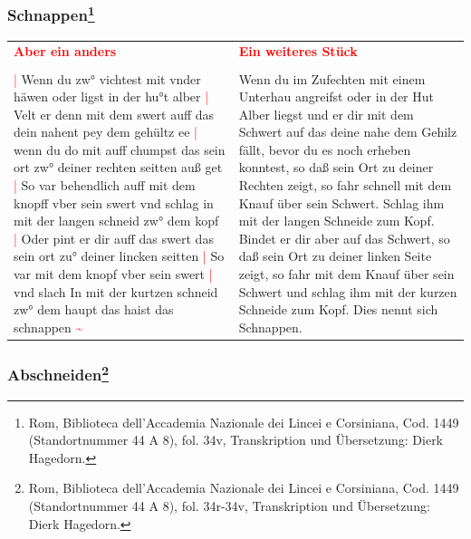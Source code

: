 \subsubsection[Schnappen]{
    Schnappen\footnote{
        \hspace*{0.5ex}Rom, Biblioteca dell'Accademia Nazionale dei Lincei e Corsiniana,
        Cod. 1449 (Standortnummer 44 A 8), fol. 34v, Transkription und Übersetzung: Dierk Hagedorn.}}

\begin{longtable}{p{6.25cm}p{6.25cm}}
    \textbf{\textcolor{red}{
        Aber ein anders}}
    &
    \textbf{\textcolor{red}{
        Ein weiteres Stück}}
    \\
    \\
    \textcolor{red}{|} Wenn du zw° vichtest mit vnder häwen oder ligst in der hu°t alber
    \textcolor{red}{|} Velt er denn mit dem swert auff das dein nahent pey dem gehültz ee
    \textcolor{red}{|} wenn du do mit auff chumpst das sein ort zw° deiner rechten seitten auß get
    \textcolor{red}{|} So var behendlich auff mit dem knopff vber sein swert vnd schlag in mit der langen schneid zw° dem kopf
    \textcolor{red}{|} Oder pint er dir auff das swert das sein ort zu° deiner lincken seitten
    \textcolor{red}{|} So var mit dem knopf vber sein swert
    \textcolor{red}{|} vnd slach In mit der kurtzen schneid zw° dem haupt das haist das schnappen \textcolor{red}{\textasciitilde{}}
    &
    Wenn du im Zufechten mit einem Unterhau angreifst oder in der Hut Alber liegst und er dir mit dem Schwert auf das deine nahe dem Gehilz fällt, bevor du es noch erheben konntest, so daß sein Ort zu deiner Rechten zeigt, so fahr schnell mit dem Knauf über sein Schwert.
    Schlag ihm mit der langen Schneide zum Kopf.
    Bindet er dir aber auf das Schwert, so daß sein Ort zu deiner linken Seite zeigt, so fahr mit dem Knauf über sein Schwert und schlag ihm mit der kurzen Schneide zum Kopf.
    Dies nennt sich Schnappen.
\end{longtable}

\newpage

\begin{center}
\end{center}

\newpage

\subsubsection[Abschneiden]{
    Abschneiden\footnote{
        \hspace*{0.5ex}Rom, Biblioteca dell'Accademia Nazionale dei Lincei e Corsiniana,
        Cod. 1449 (Standortnummer 44 A 8), fol. 34r-34v, Transkription und Übersetzung: Dierk Hagedorn.}}

